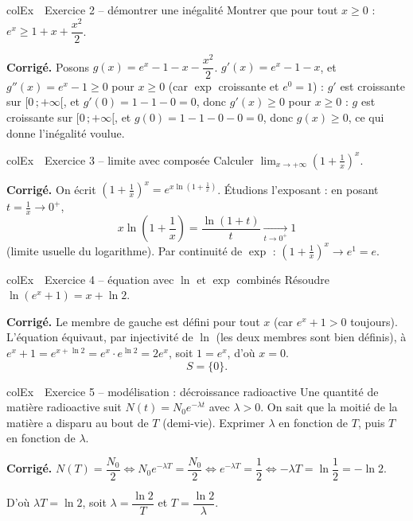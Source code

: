\documentclass[11pt,a4paper]{article}
\newenvironment{exemple}[1][Exemple]
  {\begin{fiche}{colEx}{\ding{217}~~#1}}{\end{fiche}}
\begin{document}
\begin{exemple}[Exercice 2 -- démontrer une inégalité]
Montrer que pour tout $x\geq0$ : $e^x \geq 1+x+\dfrac{x^2}{2}$.

\smallskip
\textbf{Corrigé.} Posons $g(x)=e^x-1-x-\dfrac{x^2}{2}$. $g'(x)=e^x-1-x$, et $g''(x)=e^x-1\geq0$ pour $x\geq0$ (car $\exp$ croissante et $e^0=1$) : $g'$ est croissante sur $[0\,;+\infty[$, et $g'(0)=1-1-0=0$, donc $g'(x)\geq0$ pour $x\geq0$ : $g$ est croissante sur $[0\,;+\infty[$, et $g(0)=1-1-0-0=0$, donc $g(x)\geq0$, ce qui donne l'inégalité voulue.
\end{exemple}

\begin{exemple}[Exercice 3 -- limite avec composée]
Calculer $\displaystyle\lim_{x\to+\infty}\left(1+\frac{1}{x}\right)^x$.

\smallskip
\textbf{Corrigé.} On écrit $\left(1+\frac1x\right)^x = e^{x\ln\left(1+\frac1x\right)}$. Étudions l'exposant : en posant $t=\frac1x\to0^+$,
\[
  x\ln\left(1+\frac1x\right) = \frac{\ln(1+t)}{t} \xrightarrow[t\to0^+]{} 1
\]
(limite usuelle du logarithme). Par continuité de $\exp$ : $\left(1+\frac1x\right)^x \to e^1=e$.
\end{exemple}

\begin{exemple}[Exercice 4 -- équation avec $\ln$ et $\exp$ combinés]
Résoudre $\ln(e^x+1)=x+\ln2$.

\smallskip
\textbf{Corrigé.} Le membre de gauche est défini pour tout $x$ (car $e^x+1>0$ toujours). L'équation équivaut, par injectivité de $\ln$ (les deux membres sont bien définis), à $e^x+1=e^{x+\ln2}=e^x\cdot e^{\ln2}=2e^x$, soit $1=e^x$, d'où $x=0$.
\[
  S=\{0\}.
\]
\end{exemple}

\begin{exemple}[Exercice 5 -- modélisation : décroissance radioactive]
Une quantité de matière radioactive suit $N(t)=N_0e^{-\lambda t}$ avec $\lambda>0$. On sait que la moitié de la matière a disparu au bout de $T$ (demi-vie). Exprimer $\lambda$ en fonction de $T$, puis $T$ en fonction de $\lambda$.

\smallskip
\textbf{Corrigé.} $N(T)=\dfrac{N_0}{2} \iff N_0e^{-\lambda T}=\dfrac{N_0}{2} \iff e^{-\lambda T}=\dfrac12 \iff -\lambda T=\ln\dfrac12=-\ln2$.

\smallskip
D'où $\lambda T=\ln2$, soit $\lambda=\dfrac{\ln2}{T}$ et $T=\dfrac{\ln2}{\lambda}$.
\end{exemple}
\end{document}
